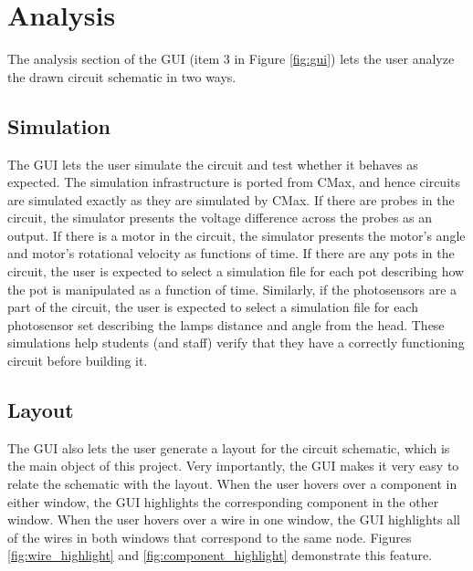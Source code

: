 \section{Analysis}

The analysis section of the GUI (item $3$ in Figure \ref{fig:gui}) lets the user
analyze the drawn circuit schematic in two ways.

\subsection{Simulation}

The GUI lets the user simulate the circuit and test whether it behaves as
expected. The simulation infrastructure is ported from CMax, and hence circuits
are simulated exactly as they are simulated by CMax. If there are probes in the
circuit, the simulator presents the voltage difference across the probes as an
output. If there is a motor in the circuit, the simulator presents the motor's
angle and motor's rotational velocity as functions of time. If there are any
pots in the circuit, the user is expected to select a simulation file for each
pot describing how the pot is manipulated as a function of time. Similarly,
if the photosensors are a part of the circuit, the user is expected to select
a simulation file for each photosensor set describing the lamps distance and
angle from the head. These simulations help students (and staff) verify that
they have a correctly functioning circuit before building it.

\subsection{Layout}

The GUI also lets the user generate a layout for the circuit schematic, which is
the main object of this project. Very importantly, the GUI makes it very easy to
relate the schematic with the layout. When the user hovers over a component in
either window, the GUI highlights the corresponding component in the other
window. When the user hovers over a wire in one window, the GUI highlights all
of the wires in both windows that correspond to the same node. Figures
\ref{fig:wire_highlight} and \ref{fig:component_highlight} demonstrate this
feature.

